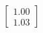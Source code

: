 \documentclass[preview]{standalone}
\begin{document}
\begin{align*}
\begin{bmatrix} 1.00 \\ 1.03 \end{bmatrix}
\end{align*}
\end{document}
